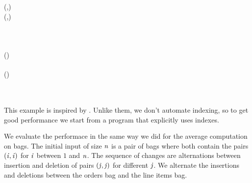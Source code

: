 \begin{hscode}\SaveRestoreHook
{}%
%
%
\>[B]{}\;\mathrel{=}(,){}\<[E]%
\\
\>[B]{}\;\mathrel{=}(,){}\<[E]%
\\[\blanklineskip]%
\>[B]{}\mathrel{:\mkern-1mu:}\;\to {}\;\to {}\<[E]%
\\
\>[B]{}\;\;\mathrel{=}\<[E]%
\\
\>[B]{}\<[3]%
\>[3]{}\mathrel{=}\;\;\<[E]%
\\
\>[B]{}\<[3]%
\>[3]{}\mathrel{=}\;(\;)\;\<[E]%
\\
\>[B]{}\<[3]%
\>[3]{}\mathrel{=}\;\;\<[E]%
\\
\>[B]{}\<[3]%
\>[3]{}\mathrel{=}\;(\;)\;\<[E]%
\\
\>[B]{}\<[3]%
\>[3]{}\mathrel{=}\;\;\<[E]%
\\
\>[B]{}\<[3]%
\>[3]{}\mathrel{=}\;\;\<[E]%
\\
\>[B]{}\<[3]%
\>[3]{}\;\<[E]%
\ColumnHook
\end{hscode}\resethooks

This example is inspired by \citet{Koch14}.
%
Unlike them, we don't automate indexing, so to get good performance we start
from a program that explicitly uses indexes.

We evaluate the performace in the same way we did for the average computation on bags. The
initial input of size \ensuremath{\Varid{n}} is a pair of bags where both contain the pairs
\ensuremath{(\Varid{i},\Varid{i})} for \ensuremath{\Varid{i}} between \ensuremath{\mathrm{1}} and \ensuremath{\Varid{n}}. The sequence of changes are alternations
between insertion and deletion of pairs \ensuremath{(\Varid{j},\Varid{j})} for different \ensuremath{\Varid{j}}. We
alternate the insertions and deletions between the orders bag and the line items
bag.

